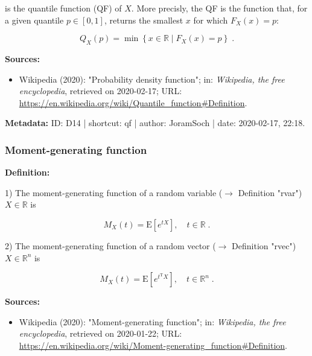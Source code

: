 \documentclass[a4paper,12pt]{book}
\begin{document}
is the quantile function (QF) of $X$. More precisly, the QF is the function that, for a given quantile $p \in [0,1]$, returns the smallest $x$ for which $F_X(x) = p$:

\begin{equation} \label{eq:qf-qf-prec}
Q_X(p) = \min \left\lbrace x \in \mathbb{R} \mid F_X(x) = p \right\rbrace \; .
\end{equation}

\vspace{1em}
\textbf{Sources:}
\begin{itemize}
\item Wikipedia (2020): "Probability density function"; in: \textit{Wikipedia, the free encyclopedia}, retrieved on 2020-02-17; URL: \url{https://en.wikipedia.org/wiki/Quantile_function#Definition}.
\end{itemize}


\vspace{1em}
\textbf{Metadata:} ID: D14 | shortcut: qf | author: JoramSoch | date: 2020-02-17, 22:18.


\subsubsection[\textit{Moment-generating function}]{Moment-generating function} \label{sec:mgf}

\vspace{1em}
\textbf{Definition:}

1) The moment-generating function of a random variable ($\rightarrow$ Definition "rvar") $X \in \mathbb{R}$ is

\begin{equation} \label{eq:mgf-mgf-var}
M_X(t) = \mathrm{E} \left[ e^{tX} \right], \quad t \in \mathbb{R} \; .
\end{equation}

2) The moment-generating function of a random vector ($\rightarrow$ Definition "rvec") $X \in \mathbb{R}^n$ is

\begin{equation} \label{eq:mgf-mgf-vec}
M_X(t) = \mathrm{E} \left[ e^{t^\mathrm{T}X} \right], \quad t \in \mathbb{R}^n \; .
\end{equation}

\vspace{1em}
\textbf{Sources:}
\begin{itemize}
\item Wikipedia (2020): "Moment-generating function"; in: \textit{Wikipedia, the free encyclopedia}, retrieved on 2020-01-22; URL: \url{https://en.wikipedia.org/wiki/Moment-generating_function#Definition}.
\end{itemize}
\end{document}
